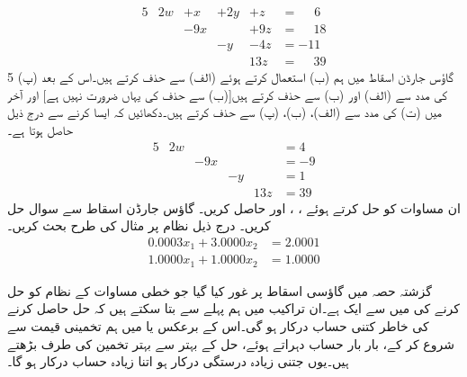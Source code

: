 \begin{alignat*}{5}
&2w&+x&+2y&+z&=\phantom{-0}6 \tag*{(الف)}\\
&{}&-9x&{}&+9z&=\phantom{-}18\tag*{(ب)}\\
&{}&{}&-y&-4z&=-11\tag*{(پ)}\\
&{}&{}&{}&13z&=\phantom{-}39\tag*{(ت)}
\end{alignat*}{5}
  گاؤس جارڈن اسقاط میں ہم  (ب) استعمال کرتے ہوئے (الف) سے   حذف  کرتے ہیں۔اس کے بعد (پ) کی مدد سے (الف) اور (ب) سے  حذف کرتے ہیں[(ب) سے حذف کی یہاں ضرورت نہیں ہے] اور آخر میں (ت) کی مدد سے (الف)، (ب)، (پ) سے   حذف کرتے ہیں۔دکھائیں کہ ایسا کرنے سے درج ذیل حاصل ہوتا ہے۔
\begin{alignat*}{5}
&2w&{}&{}&{}&=4\\
&{}&-9x&{}&{}&=-9\\
&{}&{}&-y&{}&=1\\
&{}&{}&{}&13z&=39
\end{alignat*}
ان مساوات کو حل کرتے ہوئے  ، ،  اور  حاصل کریں۔
\quad
گاؤس جارڈن اسقاط سے سوال  حل کریں۔
\quad
درج ذیل نظام پر مثال  کی طرح بحث کریں۔
\begin{align*}
0.0003x_1+3.0000x_2&=2.0001\\
1.0000x_1+1.0000x_2&=1.0000
\end{align*}

گزشتہ حصہ میں گاؤسی اسقاط پر غور کیا گیا جو خطی مساوات کے نظام کو حل کرنے کی  میں سے ایک ہے۔ان تراکیب میں ہم پہلے سے بتا سکتے ہیں کہ حل حاصل کرنے کی خاطر کتنی حساب درکار ہو گی۔اس کے برعکس  یا  میں ہم تخمینی قیمت سے شروع کر کے، بار بار حساب دہراتے ہوئے، حل کے  بہتر سے بہتر  تخمین کی طرف بڑھتے ہیں۔یوں جتنی زیادہ درستگی درکار ہو اتنا زیادہ حساب درکار ہو گا۔


